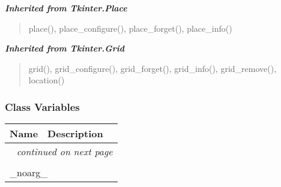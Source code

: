 \large{\textbf{\textit{Inherited from Tkinter.Place}}}

\begin{quote}
place(), place\_configure(), place\_forget(), place\_info()
\end{quote}

\large{\textbf{\textit{Inherited from Tkinter.Grid}}}

\begin{quote}
grid(), grid\_configure(), grid\_forget(), grid\_info(), grid\_remove(), location()
\end{quote}


  \subsubsection{Class Variables}

    \vspace{-1cm}
\hspace{\varindent}\begin{longtable}{|p{\varnamewidth}|p{\vardescrwidth}|l}
\cline{1-2}
\cline{1-2} \centering \textbf{Name} & \centering \textbf{Description}& \\
\cline{1-2}
\endhead\cline{1-2}\multicolumn{3}{r}{\small\textit{continued on next page}}\\\endfoot\cline{1-2}
\endlastfoot\multicolumn{2}{|l|}{\textit{Inherited from Tkinter.Misc}}\\
\multicolumn{2}{|p{\varwidth}|}{\raggedright \_noarg\_}\\
\cline{1-2}
\end{longtable}



